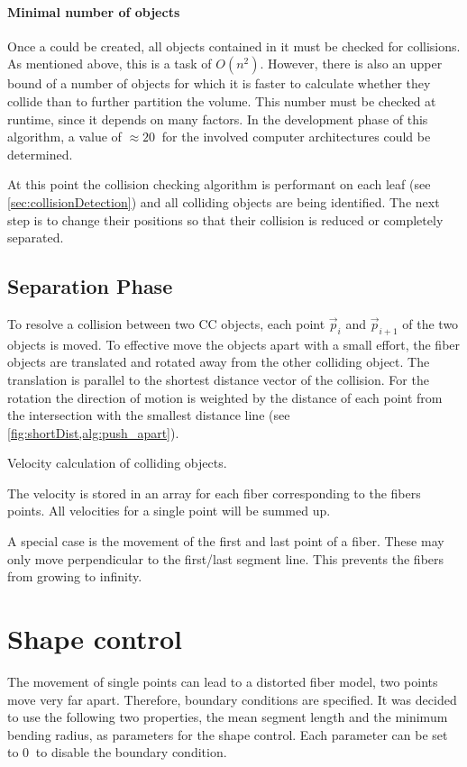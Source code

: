 \paragraph{Minimal number of objects}
Once a  could be created, all objects contained in it must be checked for collisions.
As mentioned above, this is a task of $O(n^2)$.
However, there is also an upper bound of a number of objects for which it is faster to calculate whether they collide than to further partition the volume.
This number must be checked at runtime, since it depends on many factors.
In the development phase of this algorithm, a value of $\approx \SI{20}{}$ for the involved computer architectures could be determined.
\par
%
At this point the collision checking algorithm is performant on each leaf (see \cref{sec:collisionDetection}) and all colliding objects are being identified.
The next step is to change their positions so that their collision is reduced or completely separated.
%
\subsection{Separation Phase}
% 
To resolve a collision between two \ac{CC} objects, each point $\vec{p}_i$ and $\vec{p}_{i+1}$ of the two objects is moved.
To effective move the objects apart with a small effort, the fiber objects are translated and rotated away from the other colliding object.
The translation is parallel to the shortest distance vector of the collision.
For the rotation the direction of motion is weighted by the distance of each point from the intersection with the smallest distance line (see \cref{fig:shortDist,alg:push_apart}).
% 
\begin{lstfloat}[!h]

\caption{Velocity calculation of colliding objects.}
\label{alg:push_apart}
\end{lstfloat}
% 
\par
%
The velocity is stored in an array for each fiber corresponding to the fibers points.
All velocities for a single point will be summed up.

\par
% 
A special case is the movement of the first and last point of a fiber.
These may only move perpendicular to the first/last segment line.
This prevents the fibers from growing to infinity.
% 
% 
%
\section{Shape control}\label{chap5:ShapeControl}
% 
The movement of single points can lead to a distorted fiber model, \eg{} two points move very far apart.
Therefore, boundary conditions are specified.
It was decided to use the following two properties, the mean segment length and the minimum bending radius, as parameters for the shape control.
Each parameter can be set to $\SI{0}{}$ to disable the boundary condition.
%
% 
% 
